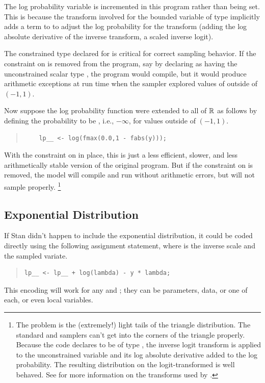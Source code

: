 The log probability variable  is incremented in this
program rather than being set.  This is because the transform involved
for the bounded variable  of type  implicitly
adds a term to  to adjust the log probability for the
transform (adding the log absolute derivative of the inverse
transform, a scaled inverse logit).

The constrained type  declared for  is
critical for correct sampling behavior.  If the constraint on 
is removed from the program, say by declaring  as having the
unconstrained scalar type , the program would compile, but
it would produce arithmetic exceptions at run time when the sampler
explored values of  outside of $(-1,1)$.

Now suppose the log probability function were extended to all of
$\mathbb{R}$ as follows by defining the probability to be ,
i.e., $-\infty$, for values outside of $(-1,1)$.
%
\begin{quote}
\begin{Verbatim}
    lp__ <- log(fmax(0.0,1 - fabs(y)));
\end{Verbatim}
\end{quote}
%
With the constraint on  in place, this is just a less
efficient, slower, and less arithmetically stable version of the
original program.  But if the constraint on  is removed, 
the model will compile and run without arithmetic errors, but will not
sample properly.%
%
\footnote{The problem is the (extremely!) light tails of the triangle
  distribution.  The standard \HMC and \NUTS samplers can't get into the
  corners of the triangle properly.  Because the \Stan code declares
   to be of type , the inverse logit
  transform is applied to the unconstrained variable and its log
  absolute derivative added to the log probability.  The resulting
  distribution on the logit-transformed  is well behaved.  See
   for more information on the
  transforms used by \Stan.}

\subsection{Exponential Distribution}

If Stan didn't happen to include the exponential distribution, it
could be coded directly using the following assignment statement,
where  is the inverse scale and  the sampled
variate.
%
\begin{quote}
\begin{Verbatim}
lp__ <- lp__ + log(lambda) - y * lambda;
\end{Verbatim}
\end{quote}
%
This encoding will work for any  and ; they can
be parameters, data, or one of each, or even local variables.

